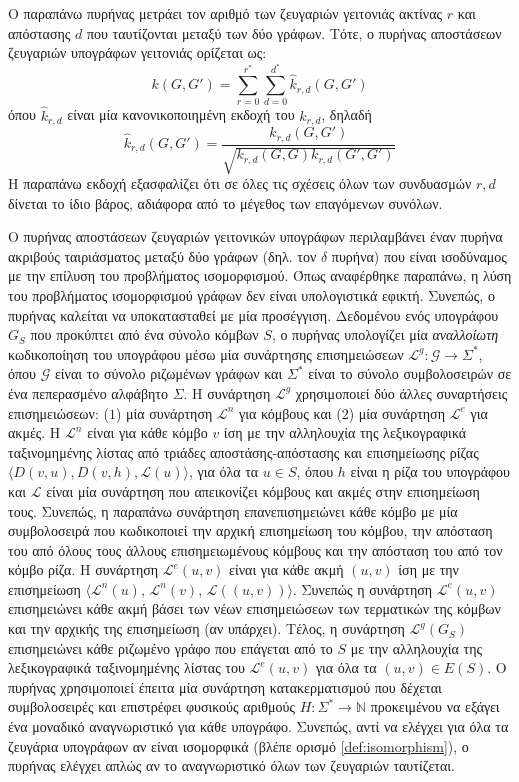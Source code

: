 Ο παραπάνω πυρήνας μετράει τον αριθμό των ζευγαριών γειτονιάς ακτίνας $r$ και απόστασης $d$ που ταυτίζονται μεταξύ των δύο γράφων.
Τότε, ο πυρήνας αποστάσεων ζευγαριών υπογράφων γειτονιάς ορίζεται ως:
\begin{equation}
    k(G, G') = \sum_{r=0}^{r^*} \sum_{d=0}^{d^*} \hat{k}_{r,d}(G, G')
\end{equation}
όπου $\hat{k}_{r,d}$ είναι μία κανονικοποιημένη εκδοχή του $k_{r,d}$, δηλαδή
\begin{equation}
    \hat{k}_{r,d}(G,G') = \frac{k_{r,d}(G,G')}{\sqrt{k_{r,d}(G,G) k_{r,d}(G',G')}}
\end{equation}
Η παραπάνω εκδοχή εξασφαλίζει ότι σε όλες τις σχέσεις όλων των συνδυασμών $r, d$ δίνεται το ίδιο βάρος, αδιάφορα από το μέγεθος των επαγόμενων συνόλων.\par
Ο πυρήνας αποστάσεων ζευγαριών γειτονικών υπογράφων περιλαμβάνει έναν πυρήνα ακριβούς ταιριάσματος μεταξύ δύο γράφων (δηλ. τον $\delta$ πυρήνα) που είναι ισοδύναμος με την επίλυση του προβλήματος ισομορφισμού.
Όπως αναφέρθηκε παραπάνω, η λύση του προβλήματος ισομορφισμού γράφων δεν είναι υπολογιστικά εφικτή.
Συνεπώς, ο πυρήνας καλείται να υποκατασταθεί με μία προσέγγιση.
Δεδομένου ενός υπογράφου $G_S$ που προκύπτει από ένα σύνολο κόμβων $S$, ο πυρήνας υπολογίζει μία \textit{αναλλοίωτη} κωδικοποίηση του υπογράφου μέσω μία συνάρτησης επισημειώσεων $\mathcal{L}^g : \mathcal{G} \rightarrow \Sigma^*$, όπου $\mathcal{G}$ είναι το σύνολο ριζωμένων γράφων και $\Sigma^*$ είναι το σύνολο συμβολοσειρών σε ένα πεπερασμένο αλφάβητο $\Sigma$.
Η συνάρτηση $\mathcal{L}^g$ χρησιμοποιεί δύο άλλες συναρτήσεις επισημειώσεων: ($1$) μία συνάρτηση $\mathcal{L}^n$ για κόμβους και ($2$) μία συνάρτηση $\mathcal{L}^e$ για ακμές.
Η $\mathcal{L}^n$ είναι για κάθε κόμβο $v$ ίση με την αλληλουχία της λεξικογραφικά ταξινομημένης λίστας από τριάδες αποστάσης-απόστασης και επισημείωσης ρίζας $\langle D(v,u), D(v,h), \mathcal{L}(u) \rangle$, για όλα τα $u \in S$, όπου $h$ είναι η ρίζα του υπογράφου και $\mathcal{L}$ είναι μία συνάρτηση που απεικονίζει κόμβους και ακμές στην επισημείωση τους.
Συνεπώς, η παραπάνω συνάρτηση επανεπισημειώνει κάθε κόμβο με μία συμβολοσειρά που κωδικοποιεί την αρχική επισημείωση του κόμβου, την απόσταση του από όλους τους άλλους επισημειωμένους κόμβους και την απόσταση του από τον κόμβο ρίζα.
Η συνάρτηση $\mathcal{L}^e(u,v)$ είναι για κάθε ακμή $(u,v)$ ίση με την επισημείωση $\langle \mathcal{L}^n(u)$, $\mathcal{L}^n(v)$, $\mathcal{L}((u,v)) \rangle$.
Συνεπώς η συνάρτηση $\mathcal{L}^e(u,v)$ επισημειώνει κάθε ακμή βάσει των νέων επισημειώσεων των τερματικών της κόμβων και την αρχικής της επισημείωση (αν υπάρχει).
Τέλος, η συνάρτηση $\mathcal{L}^g(G_S)$ επισημειώνει κάθε ριζωμένο γράφο που επάγεται από το $S$ με την αλληλουχία της λεξικογραφικά ταξινομημένης λίστας του $\mathcal{L}^e(u,v)$ για όλα τα $(u,v) \in E(S)$.
Ο πυρήνας χρησιμοποιεί έπειτα μία συνάρτηση κατακερματισμού που δέχεται συμβολοσειρές και επιστρέφει φυσικούς αριθμούς $H : \Sigma^* \rightarrow \mathbb{N}$ προκειμένου να εξάγει ένα μοναδικό αναγνωριστικό για κάθε υπογράφο.
Συνεπώς, αντί να ελέγχει για όλα τα ζευγάρια υπογράφων αν είναι ισομορφικά (βλέπε ορισμό \ref{def:isomorphism}), ο πυρήνας ελέγχει απλώς αν το αναγνωριστικό όλων των ζευγαριών ταυτίζεται.

